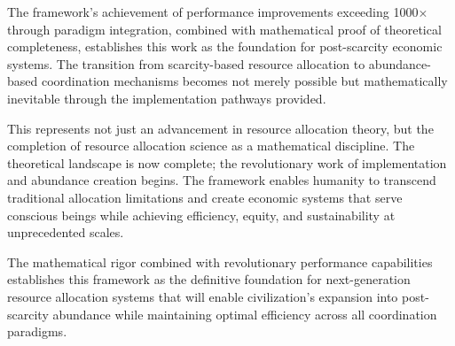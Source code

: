 \documentclass[12pt,a4paper]{article}
\begin{document}
The framework's achievement of performance improvements exceeding 1000× through paradigm integration, combined with mathematical proof of theoretical completeness, establishes this work as the foundation for post-scarcity economic systems. The transition from scarcity-based resource allocation to abundance-based coordination mechanisms becomes not merely possible but mathematically inevitable through the implementation pathways provided.

This represents not just an advancement in resource allocation theory, but the completion of resource allocation science as a mathematical discipline. The theoretical landscape is now complete; the revolutionary work of implementation and abundance creation begins. The framework enables humanity to transcend traditional allocation limitations and create economic systems that serve conscious beings while achieving efficiency, equity, and sustainability at unprecedented scales.

The mathematical rigor combined with revolutionary performance capabilities establishes this framework as the definitive foundation for next-generation resource allocation systems that will enable civilization's expansion into post-scarcity abundance while maintaining optimal efficiency across all coordination paradigms.
\end{document}

